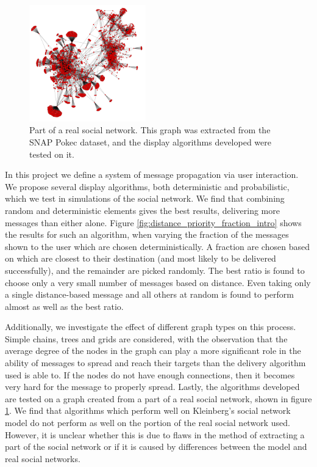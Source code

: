 \documentclass[bsc,frontabs,twoside,singlespacing,parskip,deptreport]{infthesis}     %
\begin{document}
\begin{figure}
\centering
\includegraphics[width=0.45\textwidth]{pokec_4000}
\caption{Part of a real social network. This graph was extracted from the SNAP Pokec dataset\cite{snapnets}, and the display algorithms developed were tested on it.}
\label{fig:pokec_4000_intro}
\end{figure}

In this project we define a system of message propagation via user interaction. We propose several display algorithms, both deterministic and probabilistic, which we test in simulations of the social network. We find that combining random and deterministic elements gives the best results, delivering more messages than either alone. Figure \ref{fig:distance_priority_fraction_intro} shows the results for such an algorithm, when varying the fraction of the messages shown to the user which are chosen deterministically. A fraction are chosen based on which are closest to their destination (and most likely to be delivered successfully), and the remainder are picked randomly. The best ratio is found to choose only a very small number of messages based on distance. Even taking only a single distance-based message and all others at random is found to perform almost as well as the best ratio.

Additionally, we investigate the effect of different graph types on this process. Simple chains, trees and grids are considered, with the observation that the average degree of the nodes in the graph can play a more significant role in the ability of messages to spread and reach their targets than the delivery algorithm used is able to. If the nodes do not have enough connections, then it becomes very hard for the message to properly spread. Lastly, the algorithms developed are tested on a graph created from a part of a real social network, shown in figure \ref{fig:pokec_4000_intro}. We find that algorithms which perform well on Kleinberg's social network model do not perform as well on the portion of the real social network used. However, it is unclear whether this is due to flaws in the method of extracting a part of the social network or if it is caused by differences between the model and real social networks.
\end{document}
